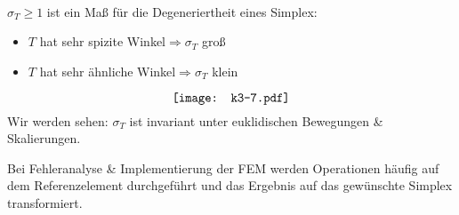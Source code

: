 \documentclass{book}
\newenvironment{itemizedot}{\begin{itemize} \renewcommand{\labelitemi}{$\bullet$}\renewcommand{\labelitemii}{$\bullet$}\renewcommand{\labelitemiii}{$\bullet$}\renewcommand{\labelitemiv}{$\bullet$}}{\end{itemize}}
\begin{document}
\begin{remark*}
  \
  
  $\sigma_T \geqslant 1$ ist ein Ma{\ss} f{\"u}r die Degeneriertheit eines
  Simplex:
  \begin{itemizedot}
    \item $T$ hat sehr spizite
    Winkel{\hspace{3em}}$\Rightarrow$\quad$\sigma_T$ gro{\ss}
    
    \item $T$ hat sehr {\"a}hnliche Winkel\qquad$\Rightarrow$\quad$\sigma_T$
    klein
  \end{itemizedot}
  \[ 
     \raisebox{-0.00256750996665246\height}{\texttt{[image: k3-7.pdf]}}
  \]
  {\hspace{1.7em}}Wir werden sehen: $\sigma_T$ ist invariant unter
  euklidischen Bewegungen \& Skalierungen. 
\end{remark*}

Bei Fehleranalyse \& Implementierung der FEM werden Operationen h{\"a}ufig auf
dem Referenzelement durchgef{\"u}hrt und das Ergebnis auf das gew{\"u}nschte
Simplex transformiert.
\end{document}
